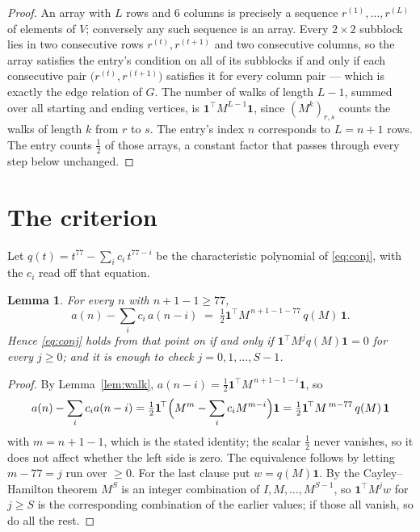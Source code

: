 \documentclass[11pt,a4paper]{article}
\theoremstyle{plain}
\newtheorem{lemma}[theorem]{Lemma}
\theoremstyle{definition}
\begin{document}
\begin{proof}
An array with $L$ rows and $6$ columns is precisely a sequence
$r^{(1)},\dots,r^{(L)}$ of elements of $V$; conversely any such sequence is an array.
Every $2\times2$ subblock lies in two consecutive rows $r^{(t)},r^{(t+1)}$ and two
consecutive columns, so the array satisfies the entry's condition on all of its subblocks
if and only if each consecutive pair $\bigl(r^{(t)},r^{(t+1)}\bigr)$ satisfies it for
every column pair --- which is exactly the edge relation of $G$. The number of walks of
length $L-1$, summed over all starting and ending vertices, is
$\mathbf{1}^{\!\top}M^{L-1}\mathbf{1}$, since $(M^{k})_{r,s}$ counts the walks of
length $k$ from $r$ to $s$. The entry's index $n$ corresponds to $L=n+1$ rows. The entry counts $\tfrac1{2}$ of those arrays, a constant factor that passes through every step below unchanged.
\end{proof}

\section{The criterion}

Let $q(t)=t^{77}-\sum_i c_i\,t^{77-i}$ be the characteristic polynomial of
\eqref{eq:conj}, with the $c_i$ read off that equation.

\begin{lemma}\label{lem:crit}
For every $n$ with $n+1-1\ge77$,
\[
a(n)-\sum_i c_i\,a(n-i)\;=\;\tfrac1{2}\mathbf{1}^{\!\top}M^{\,n+1-1-77}\,q(M)\,\mathbf{1} .
\]
Hence \eqref{eq:conj} holds from that point on if and only if
$\mathbf{1}^{\!\top}M^{j}q(M)\mathbf{1}=0$ for every $j\ge0$; and it is enough to check
$j=0,1,\dots,S-1$.
\end{lemma}

\begin{proof}
By Lemma~\ref{lem:walk}, $a(n-i)=\tfrac1{2}\mathbf{1}^{\!\top}M^{\,n+1-1-i}\mathbf{1}$, so
\[
a(n)-\sum_i c_i a(n-i)
=\tfrac1{2}\mathbf{1}^{\!\top}\Bigl(M^{m}-\sum_i c_i M^{m-i}\Bigr)\mathbf{1}
=\tfrac1{2}\mathbf{1}^{\!\top}M^{\,m-77}\,q(M)\,\mathbf{1}
\]
with $m=n+1-1$, which is the stated identity; the scalar $\tfrac1{2}$ never vanishes, so
it does not affect whether the left side is zero. The equivalence follows by letting
$m-77=j$ run over $\ge0$. For the last clause put $w=q(M)\mathbf{1}$. By the
Cayley--Hamilton theorem $M^{S}$ is an integer combination of $I,M,\dots,M^{S-1}$, so
$\mathbf{1}^{\!\top}M^{j}w$ for $j\ge S$ is the corresponding combination of the earlier
values; if those all vanish, so do all the rest.
\end{proof}
\end{document}
